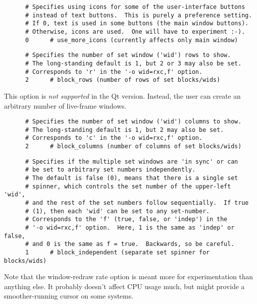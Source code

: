    \begin{verbatim}
      # Specifies using icons for some of the user-interface buttons
      # instead of text buttons.  This is purely a preference setting.
      # If 0, text is used in some buttons (the main window buttons).
      # Otherwise, icons are used.  One will have to experiment :-).
      0      # use_more_icons (currently affects only main window)
   \end{verbatim}

   \begin{verbatim}
      # Specifies the number of set window ('wid') rows to show.
      # The long-standing default is 1, but 2 or 3 may also be set.
      # Corresponds to 'r' in the '-o wid=rxc,f' option.
      2      # block_rows (number of rows of set blocks/wids)
   \end{verbatim}

      This option is \textsl{not supported} in the Qt version.
      Instead, the user can create an arbitrary number of
      live-frame windows.

   \begin{verbatim}
      # Specifies the number of set window ('wid') columns to show.
      # The long-standing default is 1, but 2 may also be set.
      # Corresponds to 'c' in the '-o wid=rxc,f' option.
      2      # block_columns (number of columns of set blocks/wids)
   \end{verbatim}

   \begin{verbatim}
      # Specifies if the multiple set windows are 'in sync' or can
      # be set to arbitrary set numbers independently.
      # The default is false (0), means that there is a single set
      # spinner, which controls the set number of the upper-left 'wid',
      # and the rest of the set numbers follow sequentially.  If true
      # (1), then each 'wid' can be set to any set-number.
      # Corresponds to the 'f' (true, false, or 'indep') in the
      # '-o wid=rxc,f' option.  Here, 1 is the same as 'indep' or false,
      # and 0 is the same as f = true.  Backwards, so be careful.
      1      # block_independent (separate set spinner for blocks/wids)
   \end{verbatim}

   Note that the window-redraw rate option is meant more for experimentation
   than anything else.  It probably doesn't affect CPU usage much, but might
   provide a smoother-running cursor on some systems.

